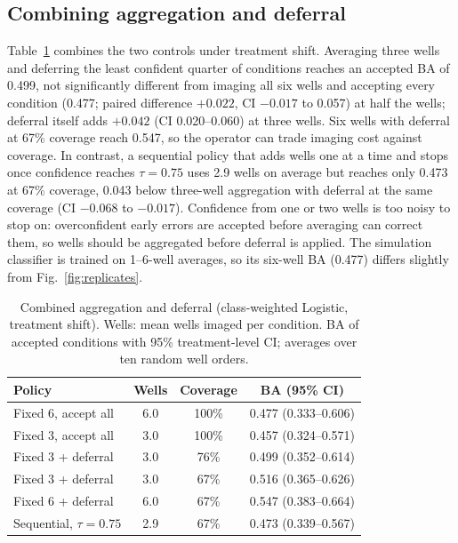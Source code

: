 \documentclass[conference]{IEEEtran}
\begin{document}
\subsection{Combining aggregation and deferral}\label{sec:policy}
Table~\ref{tab:policy} combines the two controls under treatment shift. Averaging three wells and deferring the least confident quarter of conditions reaches an accepted BA of 0.499, not significantly different from imaging all six wells and accepting every condition (0.477; paired difference $+0.022$, CI $-0.017$ to 0.057) at half the wells; deferral itself adds $+0.042$ (CI 0.020--0.060) at three wells. Six wells with deferral at 67\% coverage reach 0.547, so the operator can trade imaging cost against coverage. In contrast, a sequential policy that adds wells one at a time and stops once confidence reaches $\tau=0.75$ uses 2.9 wells on average but reaches only 0.473 at 67\% coverage, 0.043 below three-well aggregation with deferral at the same coverage (CI $-0.068$ to $-0.017$). Confidence from one or two wells is too noisy to stop on: overconfident early errors are accepted before averaging can correct them, so wells should be aggregated before deferral is applied. The simulation classifier is trained on 1--6-well averages, so its six-well BA (0.477) differs slightly from Fig.~\ref{fig:replicates}.

\begin{table}[t]
\caption{Combined aggregation and deferral (class-weighted Logistic, treatment shift). Wells: mean wells imaged per condition. BA of accepted conditions with 95\% treatment-level CI; averages over ten random well orders.}
\label{tab:policy}
\centering
\setlength{\tabcolsep}{4pt}
\begin{tabular}{lccc}
\toprule
Policy & Wells & Coverage & BA (95\% CI) \\
\midrule
Fixed 6, accept all & 6.0 & 100\% & 0.477 (0.333--0.606) \\
Fixed 3, accept all & 3.0 & 100\% & 0.457 (0.324--0.571) \\
Fixed 3 + deferral & 3.0 & 76\% & 0.499 (0.352--0.614) \\
Fixed 3 + deferral & 3.0 & 67\% & 0.516 (0.365--0.626) \\
Fixed 6 + deferral & 6.0 & 67\% & 0.547 (0.383--0.664) \\
Sequential, $\tau=0.75$ & 2.9 & 67\% & 0.473 (0.339--0.567) \\
\bottomrule
\end{tabular}
\end{table}
\end{document}
